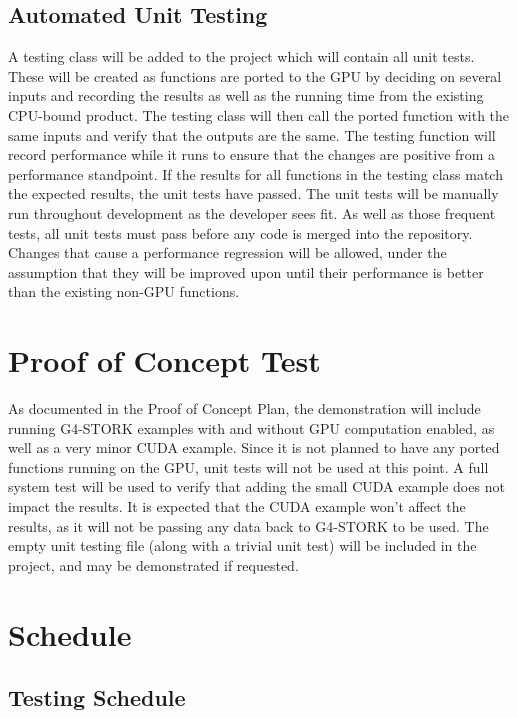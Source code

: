 \documentclass[12pt]{article}
\begin{document}
\subsection{Automated Unit Testing}
A testing class will be added to the project which will contain all unit tests. These will be created as functions are ported to the GPU by deciding on several inputs and recording the results as well as the running time from the existing CPU-bound product. The testing class will then call the ported function with the same inputs and verify that the outputs are the same. The testing function will record performance while it runs to ensure that the changes are positive from a performance standpoint. If the results for all functions in the testing class match the expected results, the unit tests have passed. The unit tests will be manually run throughout development as the developer sees fit. As well as those frequent tests, all unit tests must pass before any code is merged into the repository. Changes that cause a performance regression will be allowed, under the assumption that they will be improved upon until their performance is better than the existing non-GPU functions.

\section{Proof of Concept Test}
As documented in the Proof of Concept Plan, the demonstration will include running G4-STORK examples with and without GPU computation enabled, as well as a very minor CUDA example. Since it is not planned to have any ported functions running on the GPU, unit tests will not be used at this point. A full system test will be used to verify that adding the small CUDA example does not impact the results. It is expected that the CUDA example won't affect the results, as it will not be passing any data back to G4-STORK to be used. The empty unit testing file (along with a trivial unit test) will be included in the project, and may be demonstrated if requested.

\section{Schedule}

\subsection{Testing Schedule} %
\end{document}
